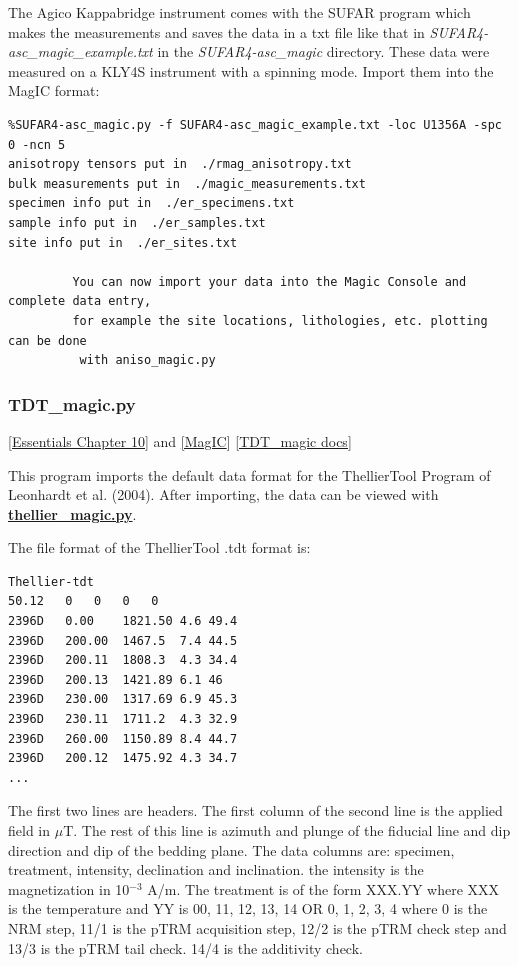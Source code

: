 \documentclass[11pt]{book}
\begin{document}
{{{The Agico Kappabridge instrument comes with the SUFAR program which makes the measurements and saves the data in a txt file like that in {\it SUFAR4-asc\_magic\_example.txt} in the {\it SUFAR4-asc\_magic} directory.  These data were measured on a KLY4S instrument with a spinning mode.    Import them into the MagIC format:

\begin{verbatim}
%SUFAR4-asc_magic.py -f SUFAR4-asc_magic_example.txt -loc U1356A -spc 0 -ncn 5
anisotropy tensors put in  ./rmag_anisotropy.txt
bulk measurements put in  ./magic_measurements.txt
specimen info put in  ./er_specimens.txt
sample info put in  ./er_samples.txt
site info put in  ./er_sites.txt

         You can now import your data into the Magic Console and complete data entry, 
         for example the site locations, lithologies, etc. plotting can be done
          with aniso_magic.py
\end{verbatim}


\subsubsection{TDT\_magic.py}
\href{http://magician.ucsd.edu/Essentials_2/WebBook2ch10.html#ch10}{ [Essentials Chapter 10]} and \href{#MagIC}{[MagIC}]
\href{http://earthref.org/PmagPy/pmagpydocs/TDT_magic-module.html}{[TDT\_magic docs]}

This program imports the default data format for the ThellierTool Program of Leonhardt et al. (2004). \nocite{leonhardt04}  After importing, the data can be viewed with \href{#thellier_magic.py}{\bf thellier\_magic.py}.  

The file format of the ThellierTool  .tdt format is:  
\begin{verbatim}
Thellier-tdt
50.12	0	0	0	0
2396D	0.00	1821.50	4.6	49.4
2396D	200.00	1467.5	7.4	44.5
2396D	200.11	1808.3	4.3	34.4
2396D	200.13	1421.89	6.1	46
2396D	230.00	1317.69	6.9	45.3
2396D	230.11	1711.2	4.3	32.9
2396D	260.00	1150.89	8.4	44.7
2396D	200.12	1475.92	4.3	34.7
...
\end{verbatim}
The first two lines are headers.  The first column of the second line is the applied field in $\mu$T. The rest of this line is azimuth and plunge of the fiducial line and dip direction and dip of the bedding plane.   
The data columns are:  
specimen, treatment, intensity,  declination and inclination.
the intensity is the magnetization in 10$^{-3}$ A/m.   The treatment is of the form XXX.YY  where XXX is the temperature and YY is   00, 11, 12, 13, 14  OR 0, 1, 2, 3, 4   where 0 is the NRM step, 11/1 is the pTRM acquisition step, 12/2 is the pTRM check step and 13/3 is the pTRM tail check.  14/4 is the additivity check.   

}}}
\end{document}
